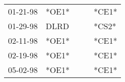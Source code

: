 \begin{supertabular}{p{0.07\textwidth}p{0.06\textwidth}p{0.02\textwidth}p{0.02\textwidth}p{0.06\textwidth}}
 01-21-98\textsuperscript{} &                   *OE1* &   &   &  *CE1* \\
 01-29-98\textsuperscript{} &  DLRD\textsuperscript{} &   &   &  *CS2* \\
 02-11-98\textsuperscript{} &                   *OE1* &   &   &  *CE1* \\
 02-19-98\textsuperscript{} &                   *OE1* &   &   &  *CE1* \\
 05-02-98\textsuperscript{} &                   *OE1* &   &   &  *CE1* \\
\end{supertabular}
